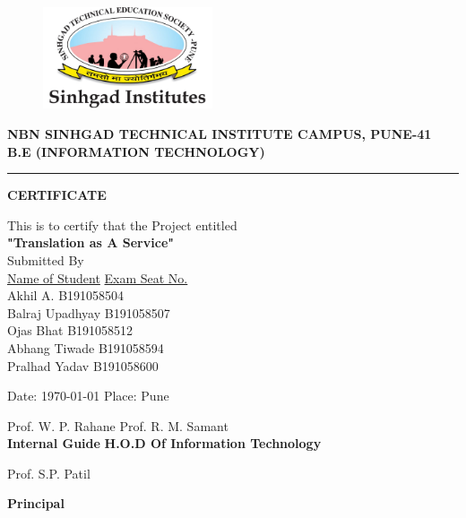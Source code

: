 \begin{center}


\begin{figure}[h]
  \begin{center}
  \includegraphics[height=30mm]{Images/Logos/Sinhgad.jpeg}
  \end{center}
\end{figure}

\vspace*{0.1cm}
\small{\textbf{NBN SINHGAD TECHNICAL INSTITUTE CAMPUS, PUNE-41}} \\
\small{\textbf{B.E (INFORMATION TECHNOLOGY)}} \\
\vspace*{0.5cm}

\vspace{5pt}
\hrule


{\normalsize{\bf{CERTIFICATE}}}

This is to certify that the Project entitled\\
\textbf{"Translation as A Service"}\\
Submitted By \\ 
\underline{Name of Student}      \hspace{1cm}     \underline{Exam Seat No.} \\
\small {Akhil A. \hspace{2.5cm} B191058504} \\
\small{Balraj Upadhyay \hspace{1cm} B191058507} \\
\small{  Ojas Bhat \hspace{2.2cm} B191058512} \\
\small{Abhang Tiwade \hspace{1.2cm} B191058594} \\
\small{Pralhad Yadav \hspace{1.4cm} B191058600} \\
\begin{flushleft}
\small{Date: \today} \hfill \small{Place: Pune}

 \end{flushleft}
Prof. W. P. Rahane \hfill Prof. R. M. Samant\\
\textbf{ Internal Guide} \hfill \textbf{H.O.D Of Information Technology}

\end{center}


\centering Prof. S.P. Patil

\centering \textbf{Principal}

\clearpage

